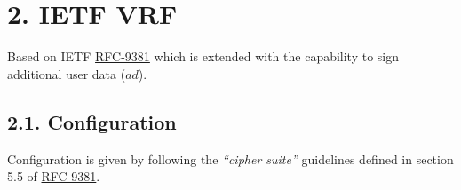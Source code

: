 \documentclass[
]{article}
\begin{document}
\section{2. IETF VRF}\label{ietf-vrf}

Based on IETF \href{https://datatracker.ietf.org/doc/rfc9381}{RFC-9381}
which is extended with the capability to sign additional user data
(\(ad\)).

\subsection{2.1. Configuration}\label{configuration}

Configuration is given by following the \emph{``cipher suite''}
guidelines defined in section 5.5 of
\href{https://datatracker.ietf.org/doc/rfc9381}{RFC-9381}.
\end{document}
